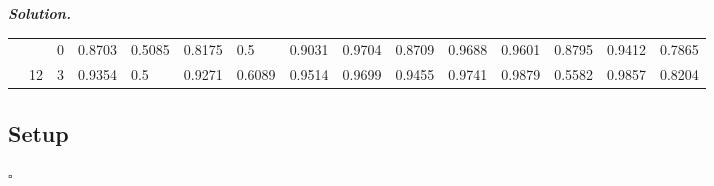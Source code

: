 \documentclass[10pt]{article}
\newenvironment{solution}[1][\it{Solution}]{\textbf{#1. } }{$\square$}
\begin{document}
\begin{solution}
\begin{table}[H]
\begin{tabular}{|l|l|l|l|l|l|l|l|l|l|l|l|l|l|l|}
\rowcolor[HTML]{C0C0C0} 
\cellcolor[HTML]{009901}                        & \cellcolor[HTML]{FFCCC9}                     & \cellcolor[HTML]{FFCE93}0                    & 0.8703                         & 0.5085                         & 0.8175                         & 0.5                            & \cellcolor[HTML]{EFEFEF}0.9031 & \cellcolor[HTML]{EFEFEF}0.9704 & \cellcolor[HTML]{EFEFEF}0.8709 & \cellcolor[HTML]{EFEFEF}0.9688 & 0.9601                         & 0.8795                         & 0.9412                         & 0.7865                         \\ \cline{3-15} 
\rowcolor[HTML]{EFEFEF} 
\multirow{-6}{*}{\cellcolor[HTML]{009901}10000} & \multirow{-2}{*}{\cellcolor[HTML]{FFCCC9}12} & \cellcolor[HTML]{F8A102}3                    & 0.9354                         & 0.5                            & 0.9271                         & 0.6089                         & \cellcolor[HTML]{C0C0C0}0.9514 & \cellcolor[HTML]{C0C0C0}0.9699 & \cellcolor[HTML]{C0C0C0}0.9455 & \cellcolor[HTML]{C0C0C0}0.9741 & 0.9879                         & 0.5582                         & 0.9857                         & 0.8204                         \\ \hline
\end{tabular}
\end{table}





\subsection*{Setup}


\end{solution}
\end{document}
